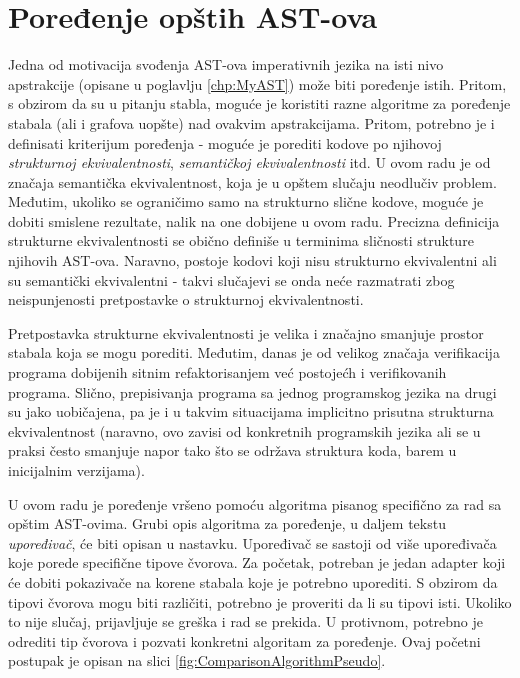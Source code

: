 \chapter{Poređenje opštih AST-ova}
\label{chp:ASTComparing}

Jedna od motivacija svođenja AST-ova imperativnih jezika na isti nivo apstrakcije (opisane u poglavlju \ref{chp:MyAST}) može biti poređenje istih. Pritom, s obzirom da su u pitanju stabla, moguće je koristiti razne algoritme za poređenje stabala (ali i grafova uopšte) nad ovakvim apstrakcijama. Pritom, potrebno je i definisati kriterijum poređenja - moguće je porediti kodove po njihovoj \emph{strukturnoj ekvivalentnosti}, \emph{semantičkoj ekvivalentnosti} itd. U ovom radu je od značaja semantička ekvivalentnost, koja je u opštem slučaju neodlučiv problem. Međutim, ukoliko se ograničimo samo na strukturno slične kodove, moguće je dobiti smislene rezultate, nalik na one dobijene u ovom radu. Precizna definicija strukturne ekvivalentnosti se obično definiše u terminima sličnosti strukture njihovih AST-ova. Naravno, postoje kodovi koji nisu strukturno ekvivalentni ali su semantički ekvivalentni - takvi slučajevi se onda neće razmatrati zbog neispunjenosti pretpostavke o strukturnoj ekvivalentnosti. 

Pretpostavka strukturne ekvivalentnosti je velika i značajno smanjuje prostor stabala koja se mogu porediti. Međutim, danas je od velikog značaja verifikacija programa dobijenih sitnim refaktorisanjem već postojećh i verifikovanih programa. Slično, prepisivanja programa sa jednog programskog jezika na drugi su jako uobičajena, pa je i u takvim situacijama implicitno prisutna strukturna ekvivalentnost (naravno, ovo zavisi od konkretnih programskih jezika ali se u praksi često smanjuje napor tako što se održava struktura koda, barem u inicijalnim verzijama). 

U ovom radu je poređenje vršeno pomoću algoritma pisanog specifično za rad sa opštim AST-ovima. Grubi opis algoritma za poređenje, u daljem tekstu \emph{upoređivač}, će biti opisan u nastavku.
Upoređivač se sastoji od više upoređivača koje porede specifične tipove čvorova. Za početak, potreban je jedan adapter koji će dobiti pokazivače na korene stabala koje je potrebno uporediti. S obzirom da tipovi čvorova mogu biti različiti, potrebno je proveriti da li su tipovi isti. Ukoliko to nije slučaj, prijavljuje se greška i rad se prekida. U protivnom, potrebno je odrediti tip čvorova i pozvati konkretni algoritam za poređenje. Ovaj početni postupak je opisan na slici \ref{fig:ComparisonAlgorithmPseudo}.

